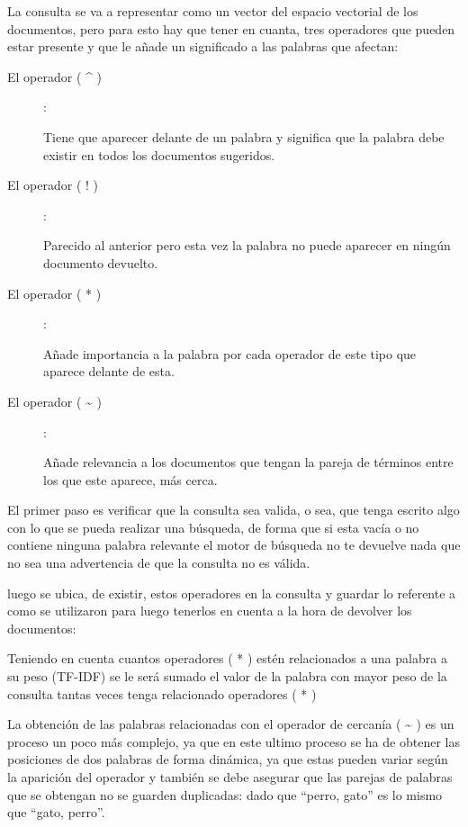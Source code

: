 \documentclass[10pt]{article}
\begin{document}
La consulta se va a representar como un vector del espacio vectorial de los documentos, pero para esto hay que tener en cuanta, tres operadores que pueden estar presente y que le añade un significado a las palabras que afectan:
\begin{description}
	\item[El operador ( \textasciicircum{} )]: 
	
	Tiene que aparecer delante de un palabra y significa que la palabra debe existir en todos los documentos sugeridos.

	\item[El operador ( ! )]: 

	Parecido al anterior pero esta vez la palabra no puede aparecer en ningún documento devuelto.

	\item[El operador ( * )]: 
	
	Añade importancia a la palabra por cada operador de este tipo que aparece delante de esta.

	\item[El operador ( \textasciitilde{} )]: 

	Añade relevancia a los documentos que tengan la pareja de términos entre los que este aparece, más cerca. 

\end{description}
\clearpage

El primer paso es verificar que la consulta sea valida, o sea, que tenga escrito algo con lo que se pueda realizar una búsqueda, de forma que si esta vacía o no contiene ninguna palabra relevante el motor de búsqueda no te devuelve nada que no sea una advertencia de que la consulta no es válida.

luego se ubica, de existir, estos operadores en la consulta y guardar lo referente a como se utilizaron para luego tenerlos en cuenta a la hora de devolver los documentos:

Teniendo en cuenta cuantos operadores ( * ) estén relacionados a una palabra a su peso (TF-IDF) se le será sumado el valor de la palabra con mayor peso de la consulta tantas veces tenga relacionado operadores ( * ) 

La obtención de las palabras relacionadas con el operador de cercanía ( \textasciitilde{} ) es un proceso un poco más complejo, ya que en este ultimo proceso se ha de obtener las posiciones de dos palabras de forma dinámica, ya que estas pueden variar según la aparición del operador y también se debe asegurar que las parejas de palabras que se obtengan no se guarden duplicadas: dado que “perro, gato” es lo mismo que “gato, perro”.
\end{document}

